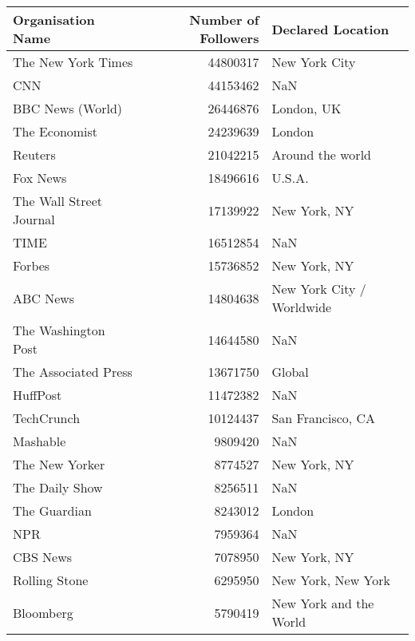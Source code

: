 \begin{longtable}{lrl}
	\caption{}
	\label{appendix:tab:locations}
	\toprule
	Organisation Name &  Number of Followers &     Declared Location \\
	\midrule
	The New York Times &   44800317 &                         New York City \\
	CNN &   44153462 &                                   NaN \\
	BBC News (World) &   26446876 &                            London, UK \\
	The Economist &   24239639 &                                London \\
	Reuters &   21042215 &                      Around the world \\
	Fox News &   18496616 &                                U.S.A. \\
	The Wall Street Journal &   17139922 &                          New York, NY \\
	TIME &   16512854 &                                   NaN \\
	Forbes &   15736852 &                          New York, NY \\
	ABC News &   14804638 &             New York City / Worldwide \\
	The Washington Post &   14644580 &                                   NaN \\
	The Associated Press &   13671750 &                                Global \\
	HuffPost &   11472382 &                                   NaN \\
	TechCrunch &   10124437 &                     San Francisco, CA \\
	Mashable &    9809420 &                                   NaN \\
	The New Yorker &    8774527 &                          New York, NY \\
	The Daily Show &    8256511 &                                   NaN \\
	The Guardian &    8243012 &                                London \\
	NPR &    7959364 &                                   NaN \\
	CBS News &    7078950 &                          New York, NY \\
	Rolling Stone &    6295950 &                    New York, New York \\
	Bloomberg &    5790419 &                New York and the World \\

\end{longtable}
